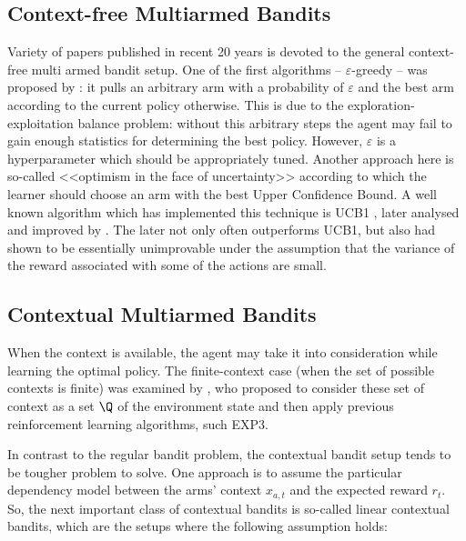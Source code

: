   \subsection{Context-free Multiarmed Bandits}
  Variety of papers published in recent 20 years is devoted to the general context-free multi armed bandit setup. One of the first algorithms -- $\varepsilon$-greedy -- was proposed by \cite{Auer2002}: it pulls an arbitrary arm with a probability of $\varepsilon$ and the best arm according to the current policy otherwise. This is due to the exploration-exploitation balance problem: without this arbitrary steps the agent may fail to gain enough statistics for determining the best policy. However, $\varepsilon$ is a hyperparameter which should be appropriately tuned. Another approach here is so-called <<optimism in the face of uncertainty>> \cite{Lai1985} according to which the learner should choose an arm with the best Upper Confidence Bound. A well known algorithm which has implemented this technique is UCB1 \cite{Auer2002}, later analysed and improved by \cite{Audibert2009}. The later not only often outperforms UCB1, but also had shown to be essentially unimprovable under the assumption that the variance of the reward associated with some of the actions are small.
  
  \subsection{Contextual Multiarmed Bandits}
  When the context is available, the agent may take it into consideration while learning the optimal policy. The finite-context case (when the set of possible contexts is finite) was examined by \cite{Auer2002b}, who proposed to consider these set of context as a set $\Q$ of the environment state and then apply previous reinforcement learning algorithms, such EXP3. 
  
  In contrast to the regular bandit problem, the contextual bandit setup tends to be tougher problem to solve. One approach is to assume the particular dependency model between the arms' context $x_{a,t}$ and the expected reward $r_t$. So, the next important class of contextual bandits is so-called linear contextual bandits, which are the setups where the following assumption holds:
  
